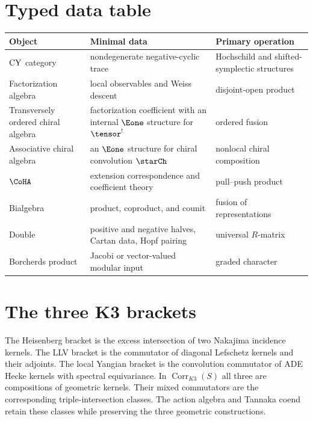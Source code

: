 \chapter{Typed data table}
\begin{center}
\small
\begin{tabularx}{0.98\textwidth}{@{}>{\raggedright\arraybackslash}p{}>{\raggedright\arraybackslash}X>{\raggedright\arraybackslash}p{}@{}}
\toprule
\textbf{Object}&\textbf{Minimal data}&\textbf{Primary operation}\\
\midrule
$\operatorname{CY}$ category&nondegenerate negative-cyclic trace&Hochschild and shifted-symplectic structures\\
Factorization algebra&local observables and Weiss descent&disjoint-open product\\
Transversely ordered chiral algebra&factorization coefficient with an internal $\Eone$ structure for $\tensor^!$&ordered fusion\\
Associative chiral algebra&an $\Eone$ structure for chiral convolution $\starCh$&nonlocal chiral composition\\
$\CoHA$&extension correspondence and coefficient theory&pull--push product\\
Bialgebra&product, coproduct, and counit&fusion of representations\\
Double&positive and negative halves, Cartan data, Hopf pairing&universal $R$-matrix\\
Borcherds product&Jacobi or vector-valued modular input&graded character\\
\bottomrule
\end{tabularx}
\end{center}

\chapter{The three K3 brackets}
The Heisenberg bracket is the excess intersection of two Nakajima incidence kernels.  The LLV bracket is the commutator of diagonal Lefschetz kernels and their adjoints.  The local Yangian bracket is the convolution commutator of ADE Hecke kernels with spectral equivariance.  In $\operatorname{Corr}_{K3}(S)$ all three are compositions of geometric kernels.  Their mixed commutators are the corresponding triple-intersection classes.  The action algebra and Tannaka coend retain these classes while preserving the three geometric constructions.

